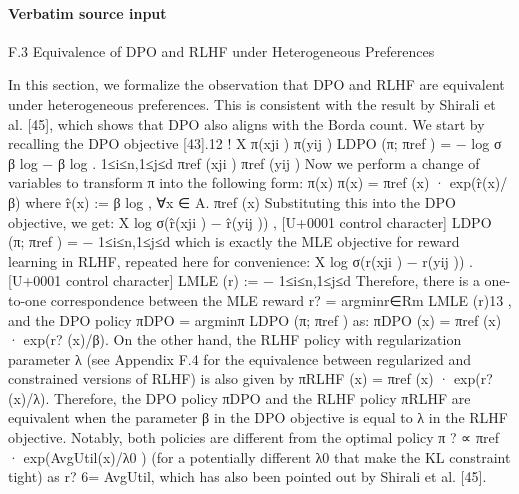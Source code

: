 \documentclass[10pt]{article}
\begin{document}
\paragraph{Verbatim source input}
\begin{ReviewVerbatim}
F.3   Equivalence of DPO and RLHF under Heterogeneous Preferences

In this section, we formalize the observation that DPO and RLHF are equivalent under heterogeneous
preferences. This is consistent with the result by Shirali et al. [45], which shows that DPO also aligns
with the Borda count. We start by recalling the DPO objective [43].12
                                                                                               !
                                      X                         π(xji )             π(yij )
              LDPO (π; πref ) = −               log σ β log                − β log               .
                                  1≤i≤n,1≤j≤d
                                                               πref (xji )         πref (yij )
Now we perform a change of variables to transform π into the following form:
                                                                    π(x)
              π(x) = πref (x) · exp(r̂(x)/β) where r̂(x) := β log            , ∀x ∈ A.
                                                                   πref (x)
Substituting this into the DPO objective, we get:
                                             X
                                                   log σ(r̂(xji ) − r̂(yij )) ,
                                                                             [U+0001 control character]
                       LDPO (π; πref ) = −
                                             1≤i≤n,1≤j≤d
which is exactly the MLE objective for reward learning in RLHF, repeated here for convenience:
                                          X
                                                   log σ(r(xji ) − r(yij )) .
                                                                           [U+0001 control character]
                       LMLE (r) := −
                                           1≤i≤n,1≤j≤d
Therefore, there is a one-to-one correspondence between the MLE reward r? =
argminr∈Rm LMLE (r)13 , and the DPO policy πDPO = argminπ LDPO (π; πref ) as:
                                 πDPO (x) = πref (x) · exp(r? (x)/β).
On the other hand, the RLHF policy with regularization parameter λ (see Appendix F.4 for the
equivalence between regularized and constrained versions of RLHF) is also given by
                                 πRLHF (x) = πref (x) · exp(r? (x)/λ).
Therefore, the DPO policy πDPO and the RLHF policy πRLHF are equivalent when the parameter β
in the DPO objective is equal to λ in the RLHF objective. Notably, both policies are different from
the optimal policy π ? ∝ πref · exp(AvgUtil(x)/λ0 ) (for a potentially different λ0 that make the KL
constraint tight) as r? 6= AvgUtil, which has also been pointed out by Shirali et al. [45].
\end{ReviewVerbatim}
\end{document}
